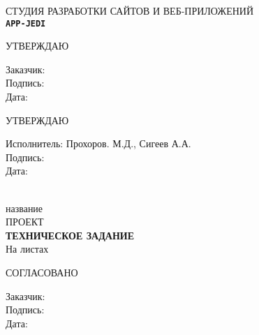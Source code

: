 %
\begin{center}
{\Large {{СТУДИЯ РАЗРАБОТКИ САЙТОВ И ВЕБ-ПРИЛОЖЕНИЙ \\ \texttt{\LARGE \bf APP-JEDI}}}}\\[1cm]

\begin{minipage}{\textwidth}
  \begin{minipage}{0.5\textwidth}
    \begin{flushleft}
      \begin{center}
        {\large УТВЕРЖДАЮ}\\
      \end{center}
      Заказчик: \\
      Подпись:\\
      Дата:
    \end{flushleft}
  \end{minipage}
  \begin{minipage}{0.5\textwidth}
    \begin{flushleft}
      \begin{center}
        {\large УТВЕРЖДАЮ}\\
      \end{center}
      Исполнитель: Прохоров. М.Д., Сигеев А.А.\\
      Подпись:\\
      Дата:
    \end{flushleft}
  \end{minipage}
\end{minipage}
\\[4cm]
{\huge название} \\ %
{\LARGE ПРОЕКТ } \\[0.5cm]
{ \Huge \bf ТЕХНИЧЕСКОЕ ЗАДАНИЕ }\\[1.5cm]

На \pageref{LastPage} листах\\[2cm]
\begin{flushleft}
\begin{minipage}{0.5\textwidth}
\begin{center}
  СОГЛАСОВАНО
\end{center}
    Заказчик: \\
    Подпись:\\
    Дата:
\end{minipage}
\end{flushleft}
\end{center}
\thispagestyle{empty}
